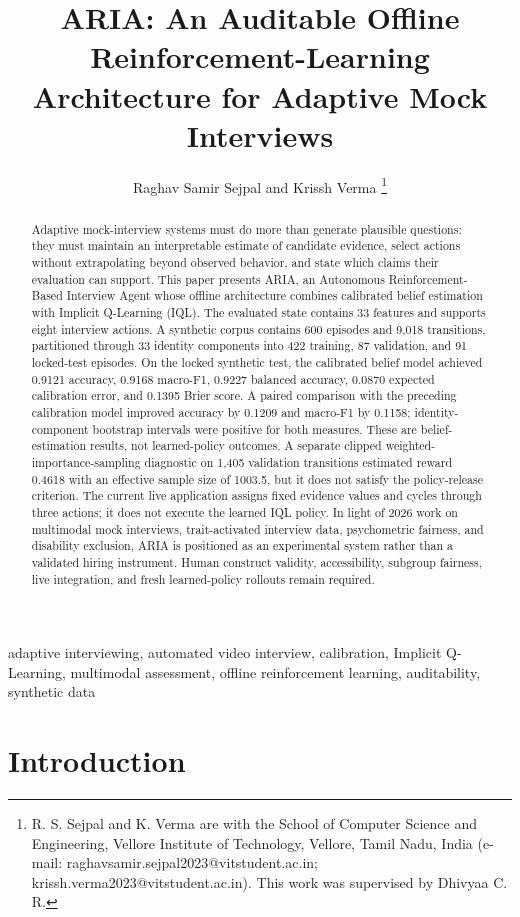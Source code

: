 \documentclass[journal]{IEEEtran}
\title{ARIA: An Auditable Offline Reinforcement-Learning Architecture for Adaptive Mock Interviews}
\author{Raghav Samir Sejpal and Krissh Verma%
\thanks{R. S. Sejpal and K. Verma are with the School of Computer Science and Engineering, Vellore Institute of Technology, Vellore, Tamil Nadu, India (e-mail: raghavsamir.sejpal2023@vitstudent.ac.in; krissh.verma2023@vitstudent.ac.in). This work was supervised by Dhivyaa C. R.}}
\begin{document}
\maketitle

\begin{abstract}

Adaptive mock-interview systems must do more than generate plausible questions: they must maintain an interpretable estimate of candidate evidence, select actions without extrapolating beyond observed behavior, and state which claims their evaluation can support. This paper presents ARIA, an Autonomous Reinforcement-Based Interview Agent whose offline architecture combines calibrated belief estimation with Implicit Q-Learning (IQL). The evaluated state contains 33 features and supports eight interview actions. A synthetic corpus contains 600 episodes and 9,018 transitions, partitioned through 33 identity components into 422 training, 87 validation, and 91 locked-test episodes. On the locked synthetic test, the calibrated belief model achieved 0.9121 accuracy, 0.9168 macro-F1, 0.9227 balanced accuracy, 0.0870 expected calibration error, and 0.1395 Brier score. A paired comparison with the preceding calibration model improved accuracy by 0.1209 and macro-F1 by 0.1158; identity-component bootstrap intervals were positive for both measures. These are belief-estimation results, not learned-policy outcomes. A separate clipped weighted-importance-sampling diagnostic on 1,405 validation transitions estimated reward 0.4618 with an effective sample size of 1003.5, but it does not satisfy the policy-release criterion. The current live application assigns fixed evidence values and cycles through three actions; it does not execute the learned IQL policy. In light of 2026 work on multimodal mock interviews, trait-activated interview data, psychometric fairness, and disability exclusion, ARIA is positioned as an experimental system rather than a validated hiring instrument. Human construct validity, accessibility, subgroup fairness, live integration, and fresh learned-policy rollouts remain required.


\end{abstract}
\begin{IEEEkeywords}
adaptive interviewing, automated video interview, calibration, Implicit Q-Learning, multimodal assessment, offline reinforcement learning, auditability, synthetic data
\end{IEEEkeywords}
\section{Introduction}
\end{document}
